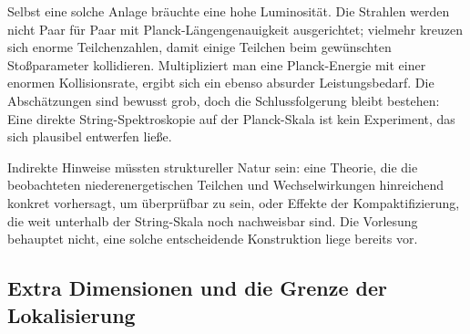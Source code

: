 Selbst eine solche Anlage bräuchte eine hohe Luminosität. Die Strahlen werden nicht Paar für Paar mit Planck-Längengenauigkeit ausgerichtet; vielmehr kreuzen sich enorme Teilchenzahlen, damit einige Teilchen beim gewünschten Stoßparameter kollidieren. Multipliziert man eine Planck-Energie mit einer enormen Kollisionsrate, ergibt sich ein ebenso absurder Leistungsbedarf. Die Abschätzungen sind bewusst grob, doch die Schlussfolgerung bleibt bestehen: Eine direkte String-Spektroskopie auf der Planck-Skala ist kein Experiment, das sich plausibel entwerfen ließe.

Indirekte Hinweise müssten struktureller Natur sein: eine Theorie, die die beobachteten niederenergetischen Teilchen und Wechselwirkungen hinreichend konkret vorhersagt, um überprüfbar zu sein, oder Effekte der Kompaktifizierung, die weit unterhalb der String-Skala noch nachweisbar sind. Die Vorlesung behauptet nicht, eine solche entscheidende Konstruktion liege bereits vor.

\subsection{Extra Dimensionen und die Grenze der Lokalisierung}

\begin{classroomqa}\end{classroomqa}

\begin{classroomqa}\end{classroomqa}


